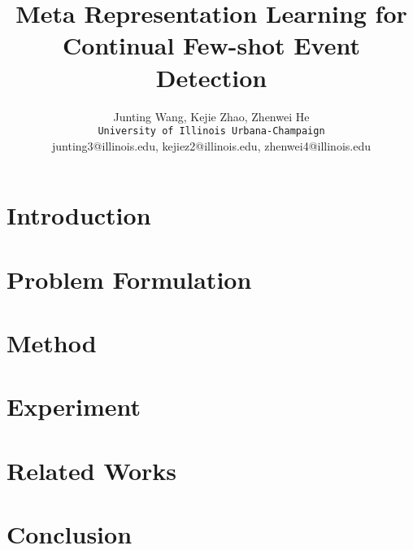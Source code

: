 \documentclass[11pt]{article}
\title{Meta Representation Learning for Continual Few-shot Event Detection}
\author{Junting Wang, Kejie Zhao, Zhenwei He \\
  \texttt{University of Illinois Urbana-Champaign} \\
  junting3@illinois.edu, kejiez2@illinois.edu, zhenwei4@illinois.edu}
\begin{document}
\maketitle\begin{abstract}

\end{abstract}


\section{Introduction}
\label{sec:introduction}



\section{Problem Formulation}
\label{sec:formulation}




\section{Method}
\label{sec:method}



\section{Experiment }
\label{sec:experiment}



\section{Related Works}
\label{sec:related_work}




\section{Conclusion}
\label{sec:conclusion}


%
%
%
\end{document}
